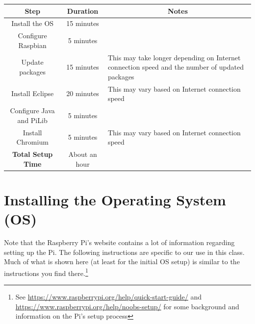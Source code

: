 \begin{center}
	\begin{tabular}{ | c | c | p{5cm} | }
		\hline
		\multicolumn{1}{|c|}{\textbf{Step}} & \multicolumn{1}{c|}{\textbf{Duration}} & \multicolumn{1}{c|}{\textbf{Notes}} \\ \hline
		Install the OS & 15 minutes\footnoteref{SdClass} &  \\ \hline
		Configure Raspbian & 5 minutes & \\ \hline
		Update packages & 15 minutes\footnoteref{SdClass} & This may take longer depending on Internet connection speed and the number of updated packages \\ \hline
		Install Eclipse & 20 minutes\footnoteref{SdClass} & This may vary based on Internet connection speed \\ \hline
		Configure Java and PiLib & 5 minutes & \\ \hline		
		Install Chromium & 5 minutes\footnoteref{SdClass} & This may vary based on Internet connection speed \\ \hline	
		\textbf{Total Setup Time} & About an hour\footnoteref{SdClass} & \\ \hline
	\end{tabular}
\end{center}

\section{Installing the Operating System (OS)}


Note that the Raspberry Pi's website contains a lot of information regarding setting up the Pi. The following instructions are specific to our use in this class. Much of what is shown here (at least for the initial OS setup) is similar to the instructions you find there.\footnote{See \url{https://www.raspberrypi.org/help/quick-start-guide/} and \url{https://www.raspberrypi.org/help/noobs-setup/} for some background and information on the Pi's setup process}

